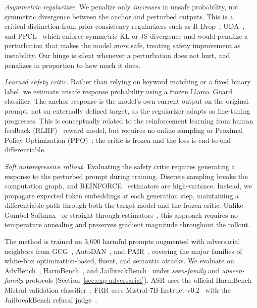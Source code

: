 \documentclass{article}
\begin{document}
\textit{Asymmetric regularizer.} We penalize only \emph{increases} in unsafe probability, not symmetric divergence between the anchor and perturbed outputs. This is a critical distinction from prior consistency regularizers such as R-Drop~\cite{liang2021rdrop}, UDA~\cite{xie2020uda}, and PPCL~\cite{qiang2024ppcl} which enforce symmetric KL or JS divergence and would penalize a perturbation that makes the model \emph{more} safe, treating safety improvement as instability. Our hinge is silent whenever a perturbation does not hurt, and penalizes in proportion to how much it does.


\textit{Learned safety critic.}
Rather than relying on keyword matching or a fixed binary label, we estimate unsafe response probability using a frozen Llama~Guard~\cite{inan2023llamaguard} classifier. The anchor response is the model's own current output on the original prompt, not an externally defined target, so the regularizer adapts as fine-tuning progresses. This is conceptually related to the reinforcement learning from human feedback (RLHF)~\cite{christiano2017rl,ouyang2022instructgpt} reward model, but requires no online sampling or Proximal Policy Optimization (PPO)~\cite{schulman2017ppo}: the critic is frozen and the loss is end-to-end differentiable.


\textit{Soft autoregressive rollout.}
Evaluating the safety critic requires generating a response to the perturbed prompt during training. Discrete sampling breaks the computation graph, and REINFORCE~\cite{williams1992reinforce} estimators are high-variance. Instead, we propagate expected token embeddings at each generation step, maintaining a differentiable path through both the target model and the frozen critic. Unlike Gumbel-Softmax~\cite{jang2017gumbel} or straight-through estimators~\cite{bengio2013ste}, this approach requires no temperature annealing and preserves gradient magnitude throughout the rollout.
%

The method is trained on 3,000 harmful prompts augmented with adversarial neighbors from GCG~\cite{zou2023gcg}, AutoDAN~\cite{liu2024autodan}, and PAIR~\cite{chao2023pair}, covering the major families of white-box optimization-based, fluent, and semantic attacks. We evaluate on AdvBench~\cite{zou2023gcg}, HarmBench~\cite{mazeika2024harmbench}, and JailbreakBench~\cite{chao2024jailbreakbench} under \emph{seen-family} and \emph{unseen-family} protocols (Section~\ref{sec:exp-adversarial}). ASR uses the official HarmBench Mistral validation classifier~\cite{mazeika2024harmbench}; FRR uses Mistral-7B-Instruct-v0.2~\cite{jiang2023mistral} with the JailbreakBench refusal judge~\cite{chao2024jailbreakbench}.
\end{document}
